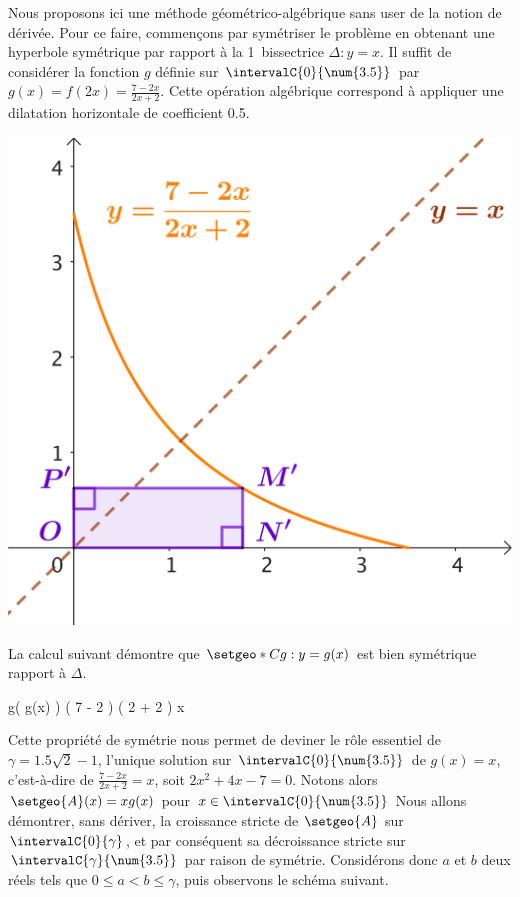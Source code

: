 Nous proposons ici une méthode géométrico-algébrique sans user de la notion de dérivée.
%
Pour ce faire, commençons par symétriser le problème en obtenant une hyperbole symétrique par rapport à la 1\iere\ bissectrice $\Delta: y = x$.
Il suffit de considérer la fonction $g$ définie sur $\intervalC{0}{\num{3.5}}$ par $g(x) = f(2x) = \frac{7-2x}{2x+2}$. Cette opération algébrique correspond à appliquer une dilatation horizontale de coefficient \num{.5}.

\smallskip

\begin{center}
	\includegraphics[scale=.67]{symmetric-goal.png}
\end{center}

La calcul suivant démontre que $\setgeo*{C}{g}: y = g(x)$ est bien symétrique rapport à $\Delta$.

\begin{stepcalc}[style=sar]
	g\big( g(x) \big)
\explnext{}
	     \Big( 7 - 2 \cdot {} \Big)
	\div \Big( 2 \cdot {} + 2 \Big)
\explnext{}
\explnext{}
\explnext{}
	x
\end{stepcalc}

Cette propriété de symétrie nous permet de deviner le rôle essentiel de
$\gamma = \num{1.5} \sqrt{2} - 1$, %
l'unique solution sur $\intervalC{0}{\num{3.5}}$ de 
$g(x) = x$,
c'est-à-dire de 
$\frac{7-2x}{2x+2} = x$,
soit
$2 x^2 + 4 x - 7 = 0$.
%
Notons alors $\setgeo{A}(x) = x g(x)$ pour $x \in \intervalC{0}{\num{3.5}}$
Nous allons démontrer, sans dériver, la croissance stricte de $\setgeo{A}$ sur $\intervalC{0}{\gamma}$, et par conséquent sa décroissance stricte sur $\intervalC{\gamma}{\num{3.5}}$ par raison de symétrie.
%
Considérons donc $a$ et $b$ deux réels tels que $0 \leq a < b \leq \gamma$, puis observons le schéma suivant.

